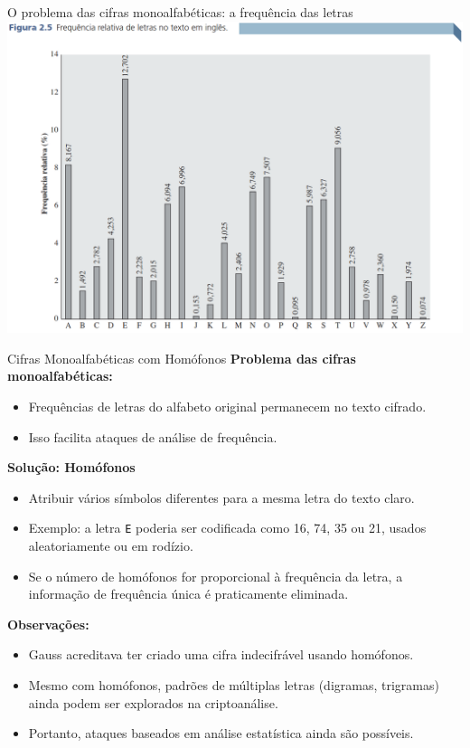 \begin{frame}{O problema das cifras monoalfabéticas: a frequência das letras}
    \centering
    \includegraphics[width=0.8\linewidth]{Figuras/frequencia-letras-ingles.png}


\end{frame}

\begin{frame}{Cifras Monoalfabéticas com Homófonos}
    \textbf{Problema das cifras monoalfabéticas:}
    \begin{itemize}
        \item Frequências de letras do alfabeto original permanecem no texto cifrado.
        \item Isso facilita ataques de análise de frequência.
    \end{itemize}

    \medskip
    \textbf{Solução: Homófonos}
    \begin{itemize}
        \item Atribuir vários símbolos diferentes para a mesma letra do texto claro.
        \item Exemplo: a letra \texttt{E} poderia ser codificada como 16, 74, 35 ou 21, usados aleatoriamente ou em rodízio.
        \item Se o número de homófonos for proporcional à frequência da letra, a informação de frequência única é praticamente eliminada.
    \end{itemize}

    \medskip
    \textbf{Observações:}
    \begin{itemize}
        \item Gauss acreditava ter criado uma cifra indecifrável usando homófonos.
        \item Mesmo com homófonos, padrões de múltiplas letras (digramas, trigramas) ainda podem ser explorados na criptoanálise.
        \item Portanto, ataques baseados em análise estatística ainda são possíveis.
    \end{itemize}
\end{frame}

